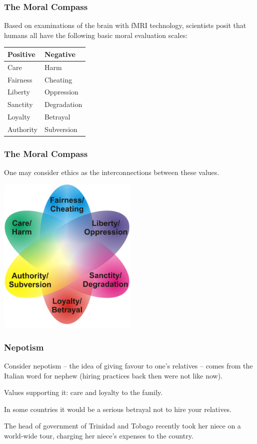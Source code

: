 \begin{frame}
\frametitle{The Moral Compass}

Based on examinations of the brain with fMRI technology, scientists posit that humans all have the following basic moral evaluation scales:

\begin{center}
\begin{tabular}{l|l}
	\textbf{Positive} & \textbf{Negative} \\ \hline
	Care & Harm \\
	Fairness & Cheating \\
	Liberty & Oppression \\
	Sanctity & Degradation \\
	Loyalty & Betrayal \\
	Authority & Subversion \\
\end{tabular}
	
\end{center}

\end{frame}



\begin{frame}
\frametitle{The Moral Compass}

One may consider ethics as the interconnections between these values.

\begin{center}
	\includegraphics[width=0.5\textwidth]{images/moralcompass}
\end{center}


\end{frame}



\begin{frame}
\frametitle{Nepotism}

Consider nepotism -- the idea of giving favour to one's relatives -- comes from the Italian word for nephew (hiring practices back then were not like now).

Values supporting it: care and loyalty to the family.

In some countries it would be a serious betrayal not to hire your relatives.

The head of government of Trinidad and Tobago recently took her niece on a world-wide
tour, charging her niece's expenses to the country.

\end{frame}



